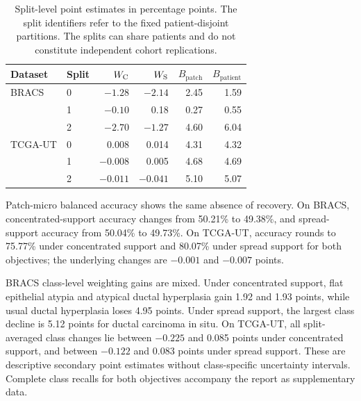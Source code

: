 \begin{table}[htbp]
\centering\small
\begin{tabular}{@{}llrrrr@{}}
\toprule
Dataset & Split & \(W_{\mathrm{C}}\) & \(W_{\mathrm{S}}\) & \(B_{\mathrm{patch}}\) & \(B_{\mathrm{patient}}\) \\
\midrule
BRACS & 0 & $-1.28$ & $-2.14$ & 2.45 & 1.59 \\
& 1 & $-0.10$ & 0.18 & 0.27 & 0.55 \\
& 2 & $-2.70$ & $-1.27$ & 4.60 & 6.04 \\
TCGA-UT & 0 & 0.008 & 0.014 & 4.31 & 4.32 \\
& 1 & $-0.008$ & 0.005 & 4.68 & 4.69 \\
& 2 & $-0.011$ & $-0.041$ & 5.10 & 5.07 \\
\bottomrule
\end{tabular}
\caption{Split-level point estimates in percentage points. The split identifiers refer to the fixed patient-disjoint partitions. The splits can share patients and do not constitute independent cohort replications.}
\label{tab:split-results}
\end{table}

\noindent Patch-micro balanced accuracy shows the same absence of recovery. On BRACS, concentrated-support accuracy changes from 50.21\% to 49.38\%, and spread-support accuracy from 50.04\% to 49.73\%. On TCGA-UT, accuracy rounds to 75.77\% under concentrated support and 80.07\% under spread support for both objectives; the underlying changes are $-0.001$ and $-0.007$ points.

BRACS class-level weighting gains are mixed. Under concentrated support, flat epithelial atypia and atypical ductal hyperplasia gain 1.92 and 1.93 points, while usual ductal hyperplasia loses 4.95 points. Under spread support, the largest class decline is 5.12 points for ductal carcinoma in situ. On TCGA-UT, all split-averaged class changes lie between $-0.225$ and 0.085 points under concentrated support, and between $-0.122$ and 0.083 points under spread support. These are descriptive secondary point estimates without class-specific uncertainty intervals. Complete class recalls for both objectives accompany the report as supplementary data.
